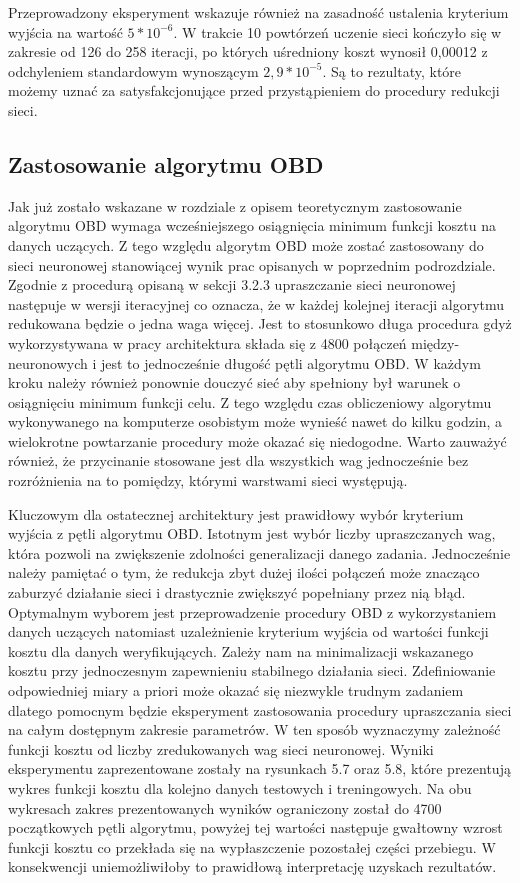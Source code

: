 \par Przeprowadzony eksperyment wskazuje również na zasadność ustalenia kryterium wyjścia na wartość \( 5*10^{-6} \). W trakcie 10 powtórzeń uczenie sieci kończyło się w zakresie od 126 do 258 iteracji, po których uśredniony koszt wynosił 0,00012 z odchyleniem standardowym wynoszącym \( 2,9*10^{-5} \). Są to rezultaty, które możemy uznać za satysfakcjonujące przed przystąpieniem do procedury redukcji sieci.

\subsection{Zastosowanie algorytmu OBD}
Jak już zostało wskazane w rozdziale z opisem teoretycznym zastosowanie algorytmu OBD wymaga wcześniejszego osiągnięcia minimum funkcji kosztu na danych uczących. Z tego względu algorytm OBD może zostać zastosowany do sieci neuronowej stanowiącej wynik prac opisanych w poprzednim podrozdziale. Zgodnie z procedurą opisaną w sekcji 3.2.3 upraszczanie sieci neuronowej następuje w wersji iteracyjnej co oznacza, że w każdej kolejnej iteracji algorytmu redukowana będzie o jedna waga więcej. Jest to stosunkowo długa procedura gdyż wykorzystywana w pracy architektura składa się z 4800 połączeń między-neuronowych i jest to jednocześnie długość pętli algorytmu OBD. W każdym kroku należy również ponownie douczyć sieć aby spełniony był warunek o osiągnięciu minimum funkcji celu. Z tego względu czas obliczeniowy algorytmu wykonywanego na komputerze osobistym może wynieść nawet do kilku godzin, a wielokrotne powtarzanie procedury może okazać się niedogodne. Warto zauważyć również, że przycinanie stosowane jest dla wszystkich wag jednocześnie bez rozróżnienia na to pomiędzy, którymi warstwami sieci występują.
\par Kluczowym dla ostatecznej architektury jest prawidłowy wybór kryterium wyjścia z pętli algorytmu OBD. Istotnym jest wybór liczby upraszczanych wag, która pozwoli na zwiększenie zdolności generalizacji danego zadania. Jednocześnie należy pamiętać o tym, że redukcja zbyt dużej ilości połączeń może znacząco zaburzyć działanie sieci i drastycznie zwiększyć popełniany przez nią błąd. Optymalnym wyborem jest przeprowadzenie procedury OBD z wykorzystaniem danych uczących natomiast uzależnienie kryterium wyjścia od wartości funkcji kosztu dla danych weryfikujących. Zależy nam na minimalizacji wskazanego kosztu przy jednoczesnym zapewnieniu stabilnego działania sieci. Zdefiniowanie odpowiedniej miary a priori może okazać się niezwykle trudnym zadaniem dlatego pomocnym będzie eksperyment zastosowania procedury upraszczania sieci na całym dostępnym zakresie parametrów. W ten sposób  wyznaczymy zależność funkcji kosztu od liczby zredukowanych wag sieci neuronowej. Wyniki eksperymentu zaprezentowane zostały na rysunkach 5.7 oraz 5.8, które prezentują wykres funkcji kosztu dla kolejno danych testowych i treningowych. Na obu wykresach zakres prezentowanych wyników ograniczony został do 4700 początkowych pętli algorytmu, powyżej tej wartości następuje gwałtowny wzrost funkcji kosztu co przekłada się na wypłaszczenie pozostałej części przebiegu. W konsekwencji uniemożliwiłoby to prawidłową interpretację uzyskach rezultatów.

